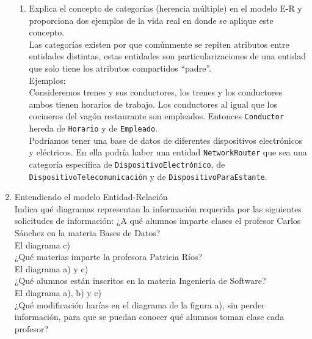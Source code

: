 \documentclass[12pt,a4paper]{article}
\begin{document}
\begin{enumerate}
\begin{enumerate}
			\item Explica el concepto de categorías (herencia múltiple) en el modelo E-R
				y proporciona dos ejemplos de la vida real en donde se aplique este concepto.\\

				Las categorías existen por que comúnmente se repiten atributos entre
				entidades distintas, estas entidades son particularizaciones de una entidad
				que solo tiene los atributos compartidos ``padre''.\\

				Ejemplos:\\
				Consideremos trenes y sus conductores, los trenes y los
				conductores ambos tienen horarios de trabajo. Los conductores
				al igual que los cocineros del vagón restaurante son empleados.
				Entonces \texttt{Conductor} hereda de \texttt{Horario} y de \texttt{Empleado}.\\

				Podríamos tener una base de datos de diferentes dispositivos electrónicos y eléctricos.
				En ella podría haber una entidad \texttt{NetworkRouter} que sea una categoría
				específica de \texttt{DispositivoElectrónico}, de \texttt{DispositivoTelecomunicación}
				y de \texttt{DispositivoParaEstante}.\\

		\end{enumerate}

	\item Entendiendo el modelo Entidad-Relación\\

		Indica qué diagramas representan la información requerida por las siguientes solicitudes de información: 
		¿A qué alumnos imparte clases el profesor Carlos Sánchez en la materia Bases de Datos?\\

		El diagrama c)\\

		¿Qué materias imparte la profesora Patricia Ríos?\\

		El diagrama a) y c)\\

		¿Qué alumnos están inscritos en la materia Ingeniería de Software?\\

		El diagrama a), b) y c)\\

		¿Qué modificación harías en el diagrama de la figura a), sin perder información, para que se puedan conocer qué alumnos toman clase cada profesor?\\


\end{enumerate}
\end{document}

